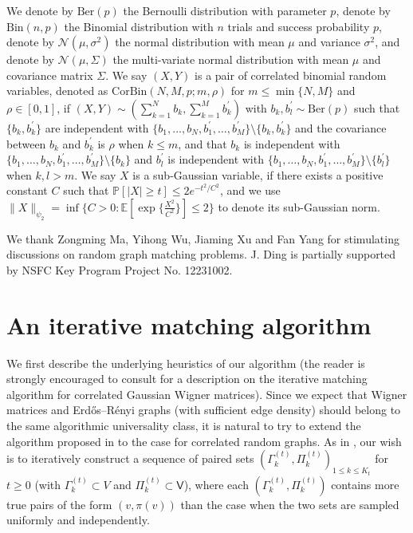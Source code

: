 \documentclass[11pt]{article}
\numberwithin{equation}{section}
\begin{document}
We denote by $\mathrm{Ber}(p)$ the Bernoulli distribution with parameter $p$, denote by $\mathrm{Bin}(n,p)$ the Binomial distribution with $n$ trials and success probability $p$, denote by $\mathcal{N}(\mu, \sigma^2)$ the normal distribution with mean $\mu$ and variance $\sigma^2$, and denote by $\mathcal{N}(\mu,\Sigma)$ the multi-variate normal distribution with mean $\mu$ and covariance matrix $\Sigma$. We say $(X,Y)$ is a pair of correlated binomial random variables, denoted as $\mathrm{CorBin}(N,M,p;m,\rho)$ for $m\leq \min\{N,M\}$ and $\rho \in [0,1]$, if $(X,Y) \sim ( \sum_{k=1}^{N} b_k, \sum_{k=1}^{M} b^{\prime}_k )$ with $b_k, b^{\prime}_l \sim \mathrm{Ber}(p)$ such that  $\{ b_k, b^{\prime}_k \}$ are independent with $\{ b_1, \ldots, b_N, b^{\prime}_1,\ldots,b^{\prime}_{M} \} \setminus \{ b_k, b^{\prime}_k \}$ and the covariance between $b_k$ and $b^{\prime}_k$ is $\rho$ when $k \leq m$, and that  $b_k$ is independent with $\{ b_1, \ldots, b_N, b^{\prime}_1,\ldots,b^{\prime}_{M} \} \setminus \{ b_k \}$ and $b^{\prime}_l$ is independent with $\{ b_1, \ldots, b_N, b^{\prime}_1,\ldots,b^{\prime}_{M} \} \setminus \{ b^{\prime}_l \}$ when $k,l>m$. We say $X$ is a sub-Gaussian variable, if there exists a positive constant $C$ such that $\mathbb{P}[ |X| \geq t ] \leq 2 e^{-{t^2}/{C^2}}$, and we use $\| X \|_{\psi_2}= \inf \{ C >0 : \mathbb{E}[ \exp \{ \frac{X^2}{C^2} \} ] \leq 2  \}$ to denote its sub-Gaussian norm.

\smallskip

 We thank Zongming Ma, Yihong Wu, Jiaming Xu and Fan Yang for stimulating discussions on random graph matching problems.  J. Ding is partially supported by NSFC Key Program Project No. 12231002.
 



\section{An iterative matching algorithm} \label{sec:algorithm-description}

We first describe the underlying heuristics of our algorithm (the reader is strongly encouraged to consult \cite[Section 2]{DL22+} for a description on the iterative matching algorithm for correlated Gaussian Wigner matrices).  Since we expect that Wigner matrices and Erd\H{o}s--R\'enyi graphs (with sufficient edge density) should belong to the same algorithmic universality class, it is natural to try to extend the algorithm proposed in \cite{DL22+} to the case for correlated random graphs. As in \cite{DL22+},  our wish is to iteratively construct a sequence of paired sets $( \Gamma^{(t)}_k,\Pi^{(t)}_k)_{1 \leq k \leq K_t}$ for $t\geq 0$ (with  $\Gamma^{(t)}_k \subset V$ and $\Pi^{(t)}_k \subset \mathsf V$), where each $( \Gamma^{(t)}_k,\Pi^{(t)}_k)$ contains more true pairs of the form $(v, \pi(v))$ than the case when the two sets are sampled uniformly and independently. 
\end{document}
